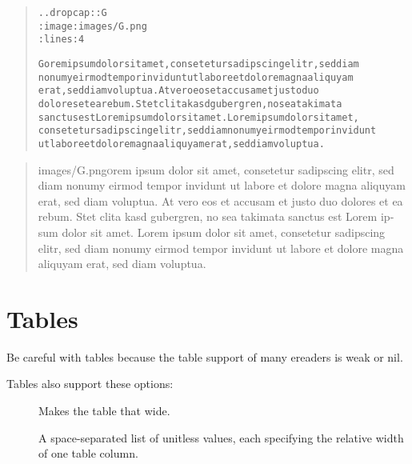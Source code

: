 \documentclass[a5paper]{book}
\begin{document}
\begin{german}
\begin{quote}
\begin{alltt}
.. dropcap:: G
   :image: images/G.png
   :lines: 4

Gorem ipsum dolor sit amet, consetetur sadipscing elitr, sed diam
nonumy eirmod tempor invidunt ut labore et dolore magna aliquyam
erat, sed diam voluptua. At vero eos et accusam et justo duo
dolores et ea rebum. Stet clita kasd gubergren, no sea takimata
sanctus est Lorem ipsum dolor sit amet. Lorem ipsum dolor sit amet,
consetetur sadipscing elitr, sed diam nonumy eirmod tempor invidunt
ut labore et dolore magna aliquyam erat, sed diam voluptua.
\end{alltt}
\end{quote}

\begin{quotation}\noindent
\begin{container}
\clearpage

\clubpenalty\@M\lettrine[lines=4,image]{images/G.png}orem ipsum dolor sit amet, consetetur sadipscing elitr, sed diam
nonumy eirmod tempor invidunt ut labore et dolore magna aliquyam
erat, sed diam voluptua. At vero eos et accusam et justo duo
dolores et ea rebum. Stet clita kasd gubergren, no sea takimata
sanctus est Lorem ipsum dolor sit amet. Lorem ipsum dolor sit amet,
consetetur sadipscing elitr, sed diam nonumy eirmod tempor invidunt
ut labore et dolore magna aliquyam erat, sed diam voluptua.\par
\end{container}
\end{quotation}

%
\label{tables}%
\hypertarget{tables}{}%
%
\section*{{\noindent}Tables}


Be careful with tables because the table support of many ereaders is
weak or nil.\par

Tables also support these options:\par

\begin{description}
\item[{}] 

Makes the table that wide.\par

\item[{}] 

A space-separated list of unitless values, each specifying the
relative width of one table column.\par


\end{description}
\end{german}
\end{document}
